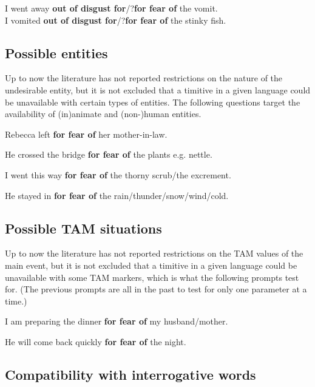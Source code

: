 \documentclass[output=paper,colorlinks,citecolor=brown]{langscibook}
\begin{document}
\ea \label{p66}
\ea \label{p66a} I went away \textbf{out of disgust for}/?\textbf{for fear of} the vomit. \\
\ex \label{p66b} I vomited \textbf{out of disgust for}/?\textbf{for fear of} the stinky fish.
\z
\z

\subsection{Possible entities}
\label{subsec:timentities}

Up to now the literature has not reported restrictions on the nature of the undesirable entity, but it is not excluded that a timitive in a given language could be unavailable with certain types of entities. The following questions target the availability of (in)animate and (non-)human entities.

\ea \label{p67} Rebecca left \textbf{for fear of} her mother-in-law.
\z

\ea \label{p68} He crossed the bridge \textbf{for fear of} the plants {\op}\textnormal{e.g.} nettle{\cp}.
\z

\ea \label{p69} I went this way \textbf{for fear of} the thorny scrub\textnormal{/}the excrement.
\z

\ea \label{p70} He stayed in \textbf{for fear of} the rain\textnormal{/}thunder\textnormal{/}snow\textnormal{/}wind\textnormal{/}cold.
\z

\subsection{Possible TAM situations}
\label{subsec:timTAM}

Up to now the literature has not reported restrictions on the TAM values of the main event, but it is not excluded that a timitive in a given language could be unavailable with some TAM markers, which is what the following prompts test for. (The previous prompts are all in the past to test for only one parameter at a time.)

\ea \label{p71} I am preparing the dinner \textbf{for fear of} my husband/mother.
\z

\ea \label{p72} He will come back quickly \textbf{for fear of} the night.
\z

\subsection{Compatibility with interrogative words}
\label{subsec:timinterrogative}
\end{document}

